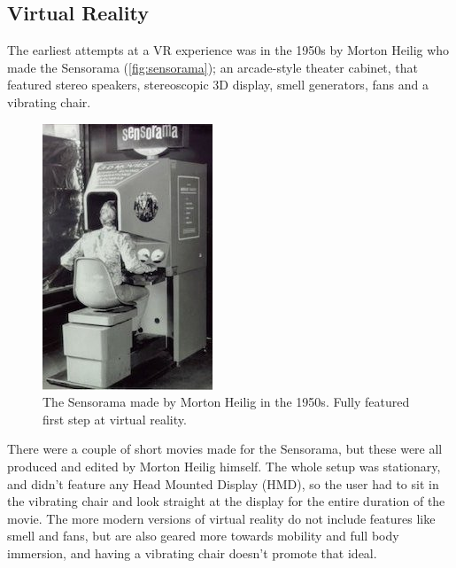 		\subsection{Virtual Reality}\label{sec:virtualReality}
		The earliest attempts at a VR experience was in the 1950s\cite{VRS} by Morton Heilig who made the Sensorama (\autoref{fig:sensorama}); an arcade-style theater cabinet, that featured stereo speakers, stereoscopic 3D display, smell generators, fans and a vibrating chair.
		\begin{figure}[H]
			\centering
			\includegraphics[width=0.4\linewidth]{figure/Analysis/sensorama2}
			\caption{The Sensorama made by Morton Heilig in the 1950s. Fully featured first step at virtual reality.}
			\label{fig:sensorama}
		\end{figure}
		There were a couple of short movies made for the Sensorama, but these were all produced and edited by Morton Heilig himself. The whole setup was stationary, and didn't feature any Head Mounted Display (HMD), so the user had to sit in the vibrating chair and look straight at the display for the entire duration of the movie. The more modern versions of virtual reality do not include features like smell and fans, but are also geared more towards mobility and full body immersion, and having a vibrating chair doesn't promote that ideal.\\
		
